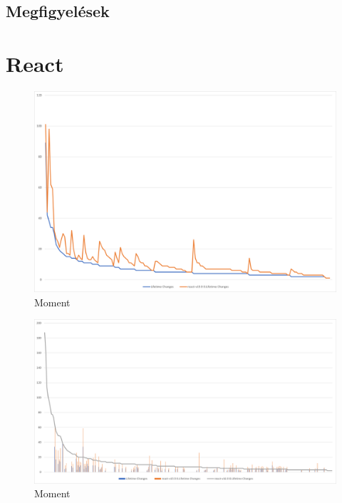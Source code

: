 \subsection{Megfigyelések}

\section{React}

\begin{figure}[H]
    \centering
    \includegraphics[width=1\textwidth]{images/react/react-14-15-changes.png}
    \caption{Moment}
    \label{fig:react-14-15}
\end{figure}

\begin{figure}[H]
    \centering
    \includegraphics[width=1\textwidth]{images/react/react-all-changes.png}
    \caption{Moment}
    \label{fig:react-14-15}
\end{figure}